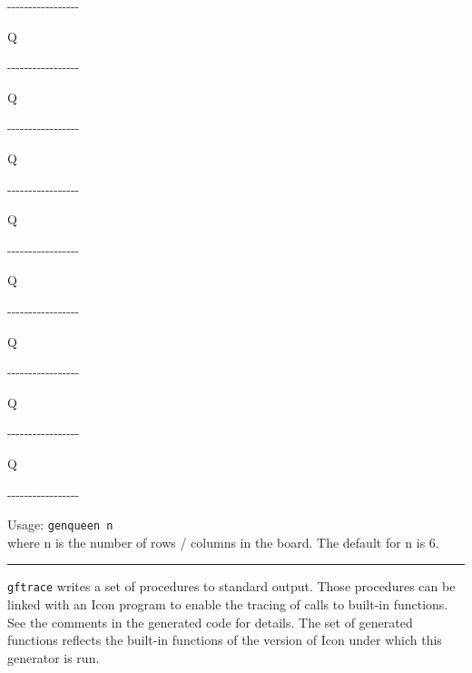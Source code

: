 {{{{{{{{{{{{\ttfamily
{}-{}-{}-{}-{}-{}-{}-{}-{}-{}-{}-{}-{}-{}-{}-{}-{}- }

{\ttfamily
{\textbar}Q{\textbar} {\textbar} {\textbar} {\textbar} {\textbar}
{\textbar} {\textbar} {\textbar}}

{\ttfamily
{}-{}-{}-{}-{}-{}-{}-{}-{}-{}-{}-{}-{}-{}-{}-{}-{}-}

{\ttfamily
{\textbar} {\textbar} {\textbar} {\textbar} {\textbar} {\textbar}
{\textbar}Q{\textbar} {\textbar}}

{\ttfamily
{}-{}-{}-{}-{}-{}-{}-{}-{}-{}-{}-{}-{}-{}-{}-{}-{}-}

{\ttfamily
{\textbar} {\textbar} {\textbar} {\textbar} {\textbar}Q{\textbar}
{\textbar} {\textbar} {\textbar}}

{\ttfamily
{}-{}-{}-{}-{}-{}-{}-{}-{}-{}-{}-{}-{}-{}-{}-{}-{}-}

{\ttfamily
{\textbar} {\textbar} {\textbar}{\textbar} {\textbar} {\textbar}
{\textbar} {\textbar}Q{\textbar}}

{\ttfamily
{}-{}-{}-{}-{}-{}-{}-{}-{}-{}-{}-{}-{}-{}-{}-{}-{}-}

{\ttfamily
{\textbar} {\textbar}Q{\textbar} {\textbar} {\textbar} {\textbar}
{\textbar} {\textbar} {\textbar}}

{\ttfamily
{}-{}-{}-{}-{}-{}-{}-{}-{}-{}-{}-{}-{}-{}-{}-{}-{}-}

{\ttfamily
{\textbar} {\textbar} {\textbar} {\textbar}Q{\textbar} {\textbar}
{\textbar} {\textbar} {\textbar}}

{\ttfamily
{}-{}-{}-{}-{}-{}-{}-{}-{}-{}-{}-{}-{}-{}-{}-{}-{}-}

{\ttfamily
{\textbar} {\textbar} {\textbar} {\textbar} {\textbar}
{\textbar}Q{\textbar} {\textbar} {\textbar}}

{\ttfamily
{}-{}-{}-{}-{}-{}-{}-{}-{}-{}-{}-{}-{}-{}-{}-{}-{}-}

{\ttfamily
{\textbar} {\textbar} {\textbar}Q{\textbar} {\textbar} {\textbar}
{\textbar} {\textbar} {\textbar}}

{\ttfamily
{}-{}-{}-{}-{}-{}-{}-{}-{}-{}-{}-{}-{}-{}-{}-{}-{}-}

Usage: \texttt{genqueen n\\
}where n is the number of rows / columns in the board. The default for n
is 6. 

\vspace{0.25cm}\hrule{}

\texttt{gftrace} writes a set of procedures to standard output. Those
procedures can be linked with an Icon program to enable the
tracing of calls to built-in functions. See the comments
in the generated code for details. The set of generated functions
reflects the built-in functions of the version of Icon under which this
generator is run. 

}}}}}}}}}}}
